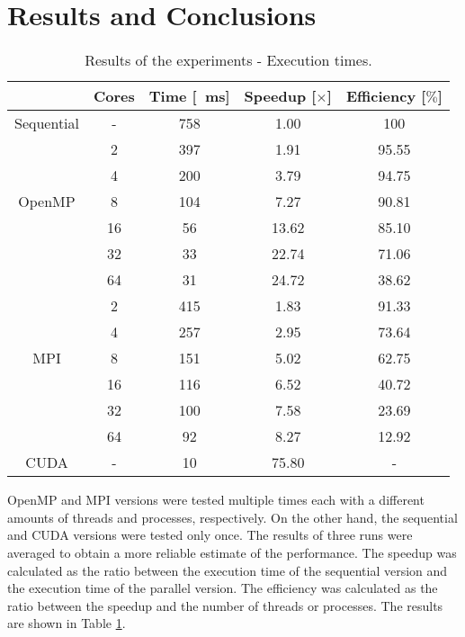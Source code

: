 \section{Results and Conclusions}

\begin{table}[!t]
    \renewcommand{\arraystretch}{1.3}
    \caption{\label{table:results}Results of the experiments - Execution times.}
    \centering
    \begin{tabular}{c|c|c|c|c}
        \hline
        \bfseries  & \bfseries Cores & \bfseries Time [\SI{}{\milli\second}] & \bfseries Speedup [$\times$] & \bfseries Efficiency [$\%$]\\
        \hline
        Sequential & - & 758 & 1.00 & 100\\
        \hline
                & 2  & 397 & 1.91  & 95.55\\
                & 4  & 200 & 3.79  & 94.75\\
        OpenMP & 8  & 104 & 7.27  & 90.81\\
                & 16 & 56  & 13.62 & 85.10\\
                & 32 & 33  & 22.74 & 71.06\\
                & 64 & 31  & 24.72 & 38.62\\
        \hline
                & 2  & 415 & 1.83  & 91.33\\
                & 4  & 257 & 2.95  & 73.64\\
        MPI    & 8  & 151 & 5.02  & 62.75\\
                & 16 & 116 & 6.52  & 40.72\\
                & 32 & 100 & 7.58  & 23.69\\
                & 64 & 92  & 8.27  & 12.92\\
        \hline
        CUDA   & - & 10 & 75.80 & - \\
        \hline
    \end{tabular}
\end{table}

OpenMP and MPI versions were tested multiple times each with a different amounts
of threads and processes, respectively. On the other hand, the sequential and CUDA %
versions were tested only once. The results of three runs were averaged to obtain %
a more reliable estimate of the performance. The speedup was calculated as the %
ratio between the execution time of the sequential version and the execution time %
of the parallel version. The efficiency was calculated as the ratio between the %
speedup and the number of threads or processes. The results are shown in Table \ref{table:results}. %

